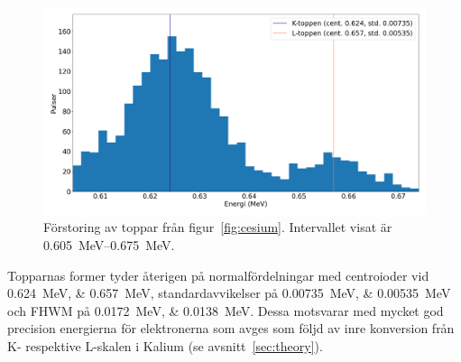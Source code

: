 \begin{figure}[htp]
    \centering
    \includegraphics[width=\textwidth, keepaspectratio]{../images/cesium_top.png}
    \caption{
        Förstoring av toppar från figur~\ref{fig:cesium}.
        Intervallet visat är \qtyrange{0.605}{0.675}{\MeV}.
    }
    \label{fig:cesiumtop}
\end{figure}

Topparnas former tyder återigen på normalfördelningar med centroioder vid
\qtylist{0.624;0.657}{\MeV}, standardavvikelser på
\qtylist{0.00735;0.00535}{\MeV} och FHWM på \qtylist{0.0172;0.0138}{\MeV}.
Dessa motsvarar med mycket god precision energierna för elektronerna som avges
som följd av inre konversion från K- respektive L-skalen i Kalium (se
avsnitt~\ref{sec:theory}).

